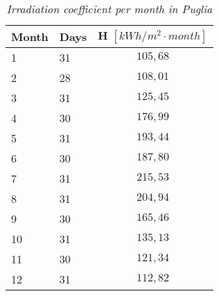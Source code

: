 \begin{table}[h!]
\centering
\begin{tabular}{|l|l|c|}
\hline
\rowcolor{bluepoli!40} \textbf{Month} & \textbf{Days} & $\textbf{H }[kWh/m^2\cdot month]$ \\ \hline
1              & 31            & $105,68$       \\ \hline
2              & 28            & $108,01$       \\ \hline
3              & 31            & $125,45$       \\ \hline
4              & 30            & $176,99$       \\ \hline
5              & 31            & $193,44$       \\ \hline
6              & 30            & $187,80$       \\ \hline
7              & 31            & $215,53$       \\ \hline
8              & 31            & $204,94$       \\ \hline
9              & 30            & $165,46$       \\ \hline
10             & 31            & $135,13$       \\ \hline
11             & 30            & $121,34$       \\ \hline
12             & 31            & $112,82$       \\ \hline
\end{tabular}
\caption{\textit{Irradiation coefficient per month in Puglia\textsuperscript{\cite{PVINFOSYSTEM}}}}
\label{tab:hpuglia}
\end{table}